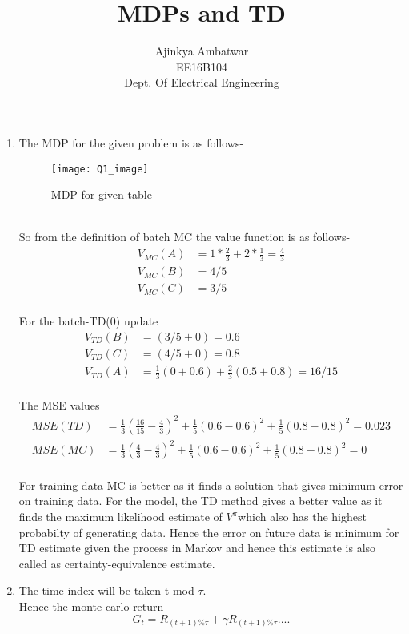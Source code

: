 \documentclass[english]{article}
\begin{document}
\title{MDPs and TD}

\author{Ajinkya Ambatwar\\
EE16B104\\
Dept. Of Electrical Engineering}
\maketitle
\begin{enumerate}
\item The MDP for the given problem is as follows-\\
\begin{figure}[H]
\texttt{[image: Q1\_image]}\caption{MDP for given table}
\end{figure}
\\
So from the definition of batch MC the value function is as follows-
\begin{align*}
V_{MC}(A) & =1*\frac{2}{3}+2*\frac{1}{3}=\frac{4}{3}\\
V_{MC}(B) & =4/5\\
V_{MC}(C) & =3/5
\end{align*}
\\
For the batch-TD(0) update
\begin{align*}
V_{TD}(B) & =(3/5+0)=0.6\\
V_{TD}(C) & =(4/5+0)=0.8\\
V_{TD}(A) & =\frac{1}{3}(0+0.6)+\frac{2}{3}(0.5+0.8)=16/15
\end{align*}
\\
The MSE values
\begin{align*}
MSE(TD) & =\frac{1}{3}(\frac{16}{15}-\frac{4}{3})^{2}+\frac{1}{5}(0.6-0.6)^{2}+\frac{1}{5}(0.8-0.8)^{2}=0.023\\
MSE(MC) & =\frac{1}{3}(\frac{4}{3}-\frac{4}{3})^{2}+\frac{1}{5}(0.6-0.6)^{2}+\frac{1}{5}(0.8-0.8)^{2}=0
\end{align*}
\\
For training data MC is better as it finds a solution that gives minimum
error on training data. For the model, the TD method gives a better
value as it finds the maximum likelihood estimate of $V^{\pi}$which
also has the highest probabilty of generating data. Hence the error
on future data is minimum for TD estimate given the process in Markov
and hence this estimate is also called as certainty-equivalence estimate.
\item The time index will be taken t mod $\tau$.\\
Hence the monte carlo return- 
\[
G_{t}=R_{(t+1)\%\tau}+\gamma R_{(t+1)\%\tau}....
\]
\end{enumerate}
\end{document}
